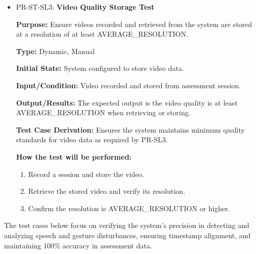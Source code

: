 \documentclass[12pt, titlepage]{article}
\begin{document}
\begin{itemize}
  \item PR-ST-SL3: \textbf{Video Quality Storage Test}
    \begin{mdframed}[linewidth=0.5mm]
      \textbf{Purpose:} Ensure videos recorded and retrieved from the system are stored at a resolution of at least AVERAGE\_RESOLUTION. \par
      \textbf{Type:} Dynamic, Manual \par
      \textbf{Initial State:} System configured to store video data. \par
      \textbf{Input/Condition:} Video recorded and stored from assessment session. \par
      \textbf{Output/Results:} The expected output is the video quality is at least \\ AVERAGE\_RESOLUTION when retrieving or storing. \par
      \textbf{Test Case Derivation:} Ensures the system maintains minimum quality standards for video data as required by PR-SL3. \par
      \textbf{How the test will be performed:}
      \begin{enumerate}[noitemsep]
        \item Record a session and store the video.
        \item Retrieve the stored video and verify its resolution.
        \item Confirm the resolution is AVERAGE\_RESOLUTION or higher.
      \end{enumerate}
  \end{mdframed}
\end{itemize}

\hspace{2em}The test cases below focus on verifying the system's precision in detecting and analyzing speech and gesture disturbances, ensuring timestamp alignment, and maintaining 100\% accuracy in assessment data.
\end{document}
